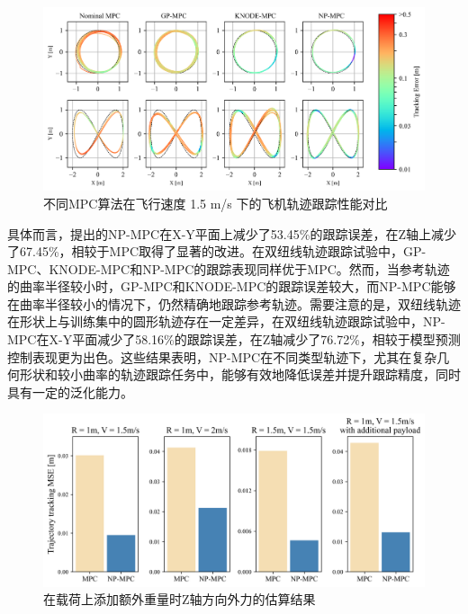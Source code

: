 \documentclass[lang=chs, degree=master, blindreview=true, winfonts=true]{yanputhesis}
\begin{document}
\begin{figure}[hbt!]
	\centering
	\includegraphics[width=38pc]{picture/kk/color.png} 
	\caption{不同MPC算法在飞行速度 1.5 m/s 下的飞机轨迹跟踪性能对比} 
	\label{color}
\end{figure}
具体而言，提出的NP-MPC在X-Y平面上减少了53.45\%的跟踪误差，在Z轴上减少了67.45\%，相较于MPC取得了显著的改进。在双纽线轨迹跟踪试验中，GP-MPC、KNODE-MPC和NP-MPC的跟踪表现同样优于MPC。然而，当参考轨迹的曲率半径较小时，GP-MPC和KNODE-MPC的跟踪误差较大，而NP-MPC能够在曲率半径较小的情况下，仍然精确地跟踪参考轨迹。需要注意的是，双纽线轨迹在形状上与训练集中的圆形轨迹存在一定差异，在双纽线轨迹跟踪试验中，NP-MPC在X-Y平面减少了58.16\%的跟踪误差，在Z轴减少了76.72\%，相较于模型预测控制表现更为出色。这些结果表明，NP-MPC在不同类型轨迹下，尤其在复杂几何形状和较小曲率的轨迹跟踪任务中，能够有效地降低误差并提升跟踪精度，同时具有一定的泛化能力。

\begin{figure}[hbt!]
	\centering
	\includegraphics[width=34pc]{picture/kk/prediction_res.png} 
	\caption{在载荷上添加额外重量时Z轴方向外力的估算结果} 
	\label{prediction_res}
\end{figure}
\end{document}
